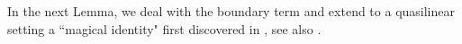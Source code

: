 \documentclass[10 pt,a4paper]{article}
\theoremstyle{definition}
\begin{document}
%
%
%
%
%
%
In the next Lemma, we deal with the boundary term and extend to a quasilinear setting a ``magical identity"  first discovered in \cite{Arma,Arma2}, see also \cite{FarMarVal,cmr}.
\end{document}
